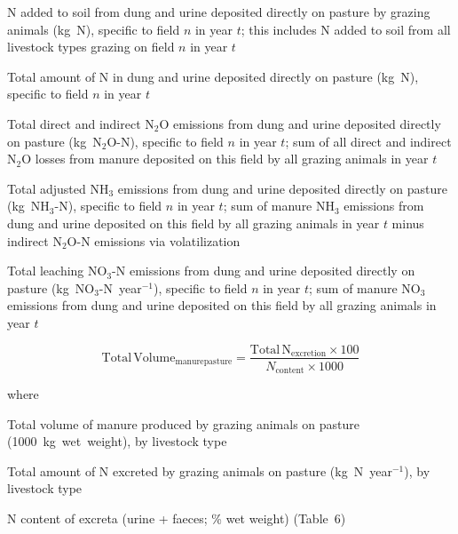 \begin{description}[font=\normalfont, leftmargin=12em, style=nextline, nosep]
    \item[$N_{\mathrm{model,pasture}(t,n)}$]
        N added to soil from dung and urine deposited directly on pasture by
        grazing animals (kg~N), specific to field $n$ in year $t$; this
        includes N added to soil from all livestock types grazing on field $n$
        in year $t$
    \item[$\mathrm{Total\,N}_{\mathrm{excretion}(t,n)}$]
        Total amount of N in dung and urine deposited directly on pasture
        (kg~N), specific to field $n$ in year $t$
    \item[$\mathrm{Total\,N_2O\text{-}N}_{\mathrm{pasture}(t,n)}$]
        Total direct and indirect N$_2$O emissions from dung and urine deposited
        directly on pasture (kg~N$_2$O-N), specific to field $n$ in year $t$;
        sum of all direct and indirect N$_2$O losses from manure deposited on
        this field by all grazing animals in year $t$
    \item[$\mathrm{Total\,NH_3\text{-}N}_{\mathrm{pasture,adju}(t,n)}$]
        Total adjusted NH$_3$ emissions from dung and urine deposited directly
        on pasture (kg~NH$_3$-N), specific to field $n$ in year $t$; sum of
        manure NH$_3$ emissions from dung and urine deposited on this field by
        all grazing animals in year $t$ minus indirect N$_2$O-N emissions via
        volatilization
    \item[$\mathrm{Total\,NO_3\text{-}N}_{\mathrm{leachingpasture}(t,n)}$]
        Total leaching NO$_3$-N emissions from dung and urine deposited directly
        on pasture (kg~NO$_3$-N~year$^{-1}$), specific to field $n$ in year
        $t$; sum of manure NO$_3$ emissions from dung and urine deposited on
        this field by all grazing animals in year $t$
\end{description}

\begin{equation}
    \mathrm{Total\,Volume}_{\mathrm{manurepasture}}
        = \frac{\mathrm{Total\,N}_{\mathrm{excretion}} \times 100}
               {N_{\mathrm{content}} \times 1000}
    \tag{Eq.\ 5.6.2-2}
\end{equation}

\noindent where

\begin{description}[font=\normalfont, leftmargin=12em, style=nextline, nosep]
    \item[$\mathrm{Total\,Volume}_{\mathrm{manurepasture}}$]
        Total volume of manure produced by grazing animals on pasture
        (1000~kg~wet~weight), by livestock type
    \item[$\mathrm{Total\,N}_{\mathrm{excretion}}$]
        Total amount of N excreted by grazing animals on pasture
        (kg~N~year$^{-1}$), by livestock type
    \item[$N_{\mathrm{content}}$]
        N content of excreta (urine + faeces; \% wet weight) (Table~6)
\end{description}

